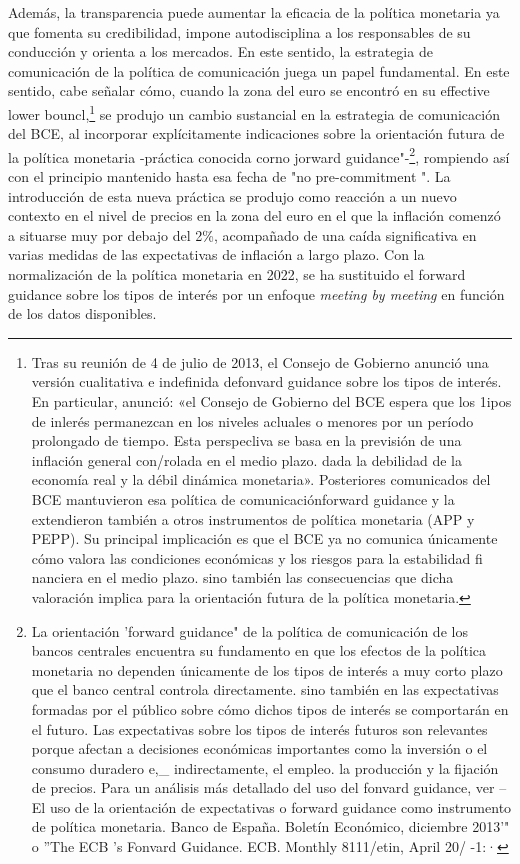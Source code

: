 \documentclass[10pt,a4paper]{article}
\begin{document}
{Además, la transparencia puede aumentar la eficacia de la política monetaria ya que fomenta su credibilidad, impone autodisciplina a los responsables de su conducción y orienta a los mercados. En este sentido, la estrategia de comunicación de la política de comunicación juega un papel fundamental. En este sentido, cabe señalar cómo, cuando la zona del euro se encontró en su effective lower bouncl,\footnote{%
    Tras su reunión de 4 de julio de 2013, el Consejo de Gobierno anunció una versión cualitativa e indefinida defonvard guidance sobre los tipos de interés. En particular, anunció: «el Consejo de Gobierno del BCE espera que los 1ipos de inlerés permanezcan en los niveles acluales o menores por un período prolongado de tiempo. Esta perspecliva se basa en la previsión de una inflación general con/rolada en el medio plazo. dada la debilidad de la economía real y la débil dinámica monetaria». Posteriores comunicados del BCE mantuvieron esa política de comunicaciónforward guidance y la extendieron también a otros instrumentos de política monetaria (APP y PEPP). Su principal implicación es que el BCE ya no comunica únicamente cómo valora las condiciones económicas y los riesgos para la estabilidad fi nanciera en el medio plazo. sino también las consecuencias que dicha valoración implica para la orientación futura de la política monetaria.
} se produjo un cambio sustancial en la estrategia de comunicación del BCE, al incorporar explícitamente indicaciones sobre la orientación futura de la política monetaria -práctica conocida corno jorward guidance"-\footnote{%
    La orientación 'forward guidance" de la política de comunicación de los bancos centrales encuentra su fundamento en que los efectos de la política monetaria no dependen únicamente de los tipos de interés a muy corto plazo que el banco central controla directamente. sino también en las expectativas formadas por el público sobre cómo dichos tipos de interés se comportarán en el futuro. Las expectativas sobre los tipos de interés futuros son relevantes porque afectan a decisiones económicas importantes como la inversión o el consumo duradero e,_ indirectamente, el empleo. la producción y la fijación de precios. Para un análisis más detallado del uso del fonvard guidance, ver --El uso de la orientación de expectativas o forward guidance como instrumento de política monetaria. Banco de España. Boletín Económico, diciembre 2013'" o ''The ECB 's Fonvard Guidance. ECB. Monthly 8111/etin, April 20/ -1:·
}, rompiendo así con el principio mantenido hasta esa fecha de "no pre-commitment ". La introducción de esta nueva práctica se produjo como reacción a un nuevo contexto en el nivel de precios en la zona del euro en el que la inflación comenzó a situarse muy por debajo del 2\%, acompañado de una caída significativa en varias medidas de las expectativas de inflación a largo plazo. Con la normalización de la política monetaria en 2022, se ha sustituido el forward guidance sobre los tipos de interés por un enfoque \textit{meeting by meeting} en función de los datos disponibles. 

}
\end{document}
